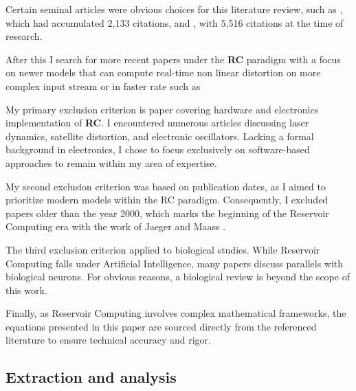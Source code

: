 \vspace{0.5cm}

Certain seminal articles were obvious choices for this literature review, such as \cite{Appeltant2011Information}, which had accumulated 2,133 citations, and \cite{maass2002realtime}, with 5,516 citations at the time of research.

\vspace{0.5cm}

After this I search for more recent papers under the \textbf{RC} paradigm with a focus on newer models that can compute real-time non linear distortion on more complex input stream or in faster rate such as \cite{goldmann2020deep, Gauthier2021, peixeiro2022time}

\vspace{0.5cm}

My primary exclusion criterion is paper covering hardware and electronics implementation of \textbf{RC}. I encountered numerous articles discussing laser dynamics, satellite distortion, and electronic oscillators. Lacking a formal background in electronics, I chose to focus exclusively on software-based approaches to remain within my area of expertise.

\vspace{0.5cm}

My second exclusion criterion was based on publication dates, as I aimed to prioritize modern models within the RC paradigm. Consequently, I excluded papers older than the year 2000, which marks the beginning of the Reservoir Computing era with the work of Jaeger \cite{Jaeger10ESN} and Maass \cite{maass2002realtime}.

\vspace{0.5cm}


The third exclusion criterion applied to biological studies. While Reservoir Computing falls under Artificial Intelligence, many papers discuss parallels with biological neurons. For obvious reasons, a biological review is beyond the scope of this work. 

\vspace{0.5cm}

Finally, as Reservoir Computing involves complex mathematical frameworks, the equations presented in this paper are sourced directly from the referenced literature to ensure technical accuracy and rigor.

\subsection{Extraction and analysis}

